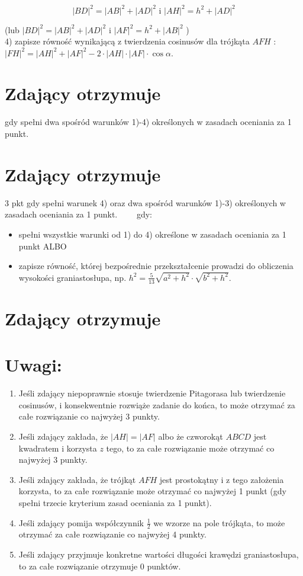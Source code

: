 \documentclass[10pt]{article}
\begin{document}
$$
|B D|^{2}=|A B|^{2}+|A D|^{2} \text { i }|A H|^{2}=h^{2}+|A D|^{2}
$$

(lub $|B D|^{2}=|A B|^{2}+|A D|^{2}$ i $|A F|^{2}=h^{2}+|A B|^{2}$ )\\
4) zapisze równość wynikającą z twierdzenia cosinusów dla trójkąta $A F H$ :\\
$|F H|^{2}=|A H|^{2}+|A F|^{2}-2 \cdot|A H| \cdot|A F| \cdot \cos \alpha$.

\section*{Zdający otrzymuje}
 gdy spełni dwa spośród warunków 1)-4) określonych w zasadach oceniania za 1 punkt.\section*{Zdający otrzymuje}
 3 pkt gdy spełni warunek 4) oraz dwa spośród warunków 1)-3) określonych w zasadach oceniania za 1 punkt.$\qquad$ gdy:

\begin{itemize}
  \item spełni wszystkie warunki od 1) do 4) określone w zasadach oceniania za 1 punkt ALBO
  \item zapisze równość, której bezpośrednie przekształcenie prowadzi do obliczenia wysokości graniastosłupa, np. $h^{2}=\frac{5}{13} \sqrt{a^{2}+h^{2}} \cdot \sqrt{b^{2}+h^{2}}$.
\end{itemize}

\section*{Zdający otrzymuje}
\section*{Uwagi:}
\begin{enumerate}
  \item Jeśli zdający niepoprawnie stosuje twierdzenie Pitagorasa lub twierdzenie cosinusów, i konsekwentnie rozwiąże zadanie do końca, to może otrzymać za całe rozwiązanie co najwyżej 3 punkty.
  \item Jeśli zdający zakłada, że $|A H|=|A F|$ albo że czworokąt $A B C D$ jest kwadratem i korzysta $z$ tego, to za całe rozwiązanie może otrzymać co najwyżej 3 punkty.
  \item Jeśli zdający zakłada, że trójkąt $A F H$ jest prostokątny i z tego założenia korzysta, to za całe rozwiązanie może otrzymać co najwyżej 1 punkt (gdy spełni trzecie kryterium zasad oceniania za 1 punkt).
  \item Jeśli zdający pomija współczynnik $\frac{1}{2}$ we wzorze na pole trójkąta, to może otrzymać za całe rozwiązanie co najwyżej 4 punkty.
  \item Jeśli zdający przyjmuje konkretne wartości długości krawędzi graniastosłupa, to za całe rozwiązanie otrzymuje 0 punktów.
\end{enumerate}
\end{document}
